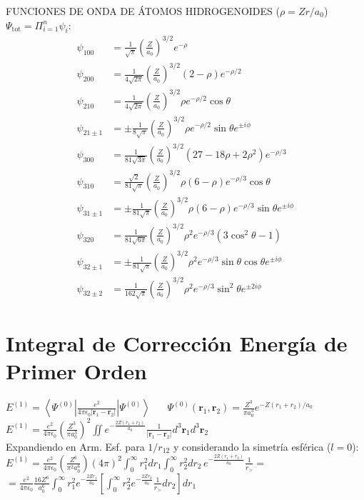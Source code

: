
FUNCIONES DE ONDA DE ÁTOMOS HIDROGENOIDES ($\rho = Zr/a_0$) $\Psi_{\text{tot}}= \Pi_{i=1}^n \psi_i$:
\begin{align*}
\psi_{100} &= \frac{1}{\sqrt{\pi}} \left(\frac{Z}{a_0}\right)^{3/2} e^{-\rho} \\
\psi_{200} &= \frac{1}{4\sqrt{2\pi}} \left(\frac{Z}{a_0}\right)^{3/2} (2-\rho)e^{-\rho/2} \\
\psi_{210} &= \frac{1}{4\sqrt{2\pi}} \left(\frac{Z}{a_0}\right)^{3/2} \rho e^{-\rho/2} \cos\theta \\
\psi_{21\pm1} &= \pm \frac{1}{8\sqrt{\pi}} \left(\frac{Z}{a_0}\right)^{3/2} \rho e^{-\rho/2} \sin\theta e^{\pm i\phi} \\
\psi_{300} &= \frac{1}{81\sqrt{3\pi}} \left(\frac{Z}{a_0}\right)^{3/2} (27 - 18\rho + 2\rho^2)e^{-\rho/3} \\
\psi_{310} &= \frac{\sqrt{2}}{81\sqrt{\pi}} \left(\frac{Z}{a_0}\right)^{3/2} \rho(6 - \rho)e^{-\rho/3} \cos\theta \\
\psi_{31\pm1} &= \pm \frac{1}{81\sqrt{\pi}} \left(\frac{Z}{a_0}\right)^{3/2} \rho(6 - \rho)e^{-\rho/3} \sin\theta e^{\pm i\phi} \\
\psi_{320} &= \frac{1}{81\sqrt{6\pi}} \left(\frac{Z}{a_0}\right)^{3/2} \rho^2 e^{-\rho/3} (3\cos^2\theta - 1) \\
\psi_{32\pm1} &= \pm \frac{1}{81\sqrt{\pi}} \left(\frac{Z}{a_0}\right)^{3/2} \rho^2 e^{-\rho/3} \sin\theta \cos\theta e^{\pm i\phi} \\
\psi_{32\pm2} &= \frac{1}{162\sqrt{\pi}} \left(\frac{Z}{a_0}\right)^{3/2} \rho^2 e^{-\rho/3} \sin^2\theta e^{\pm 2i\phi}
\end{align*}



\section*{Integral de Corrección Energía de Primer Orden }
$ E^{(1)} = \left\langle \Psi^{(0)} \left| \frac{e^2}{4\pi\epsilon_0 |\mathbf{r}_1 - \mathbf{r}_2|} \right| \Psi^{(0)} \right\rangle
\;\;\;\;\;\; \Psi^{(0)}(\mathbf{r}_1, \mathbf{r}_2) = \frac{Z^3}{\pi a_0^3} e^{-Z(r_1+r_2)/a_0}$
$
E^{(1)} = \frac{e^2}{4\pi\epsilon_0} \left( \frac{Z^3}{\pi a_0^3} \right)^2 \iint e^{-\frac{2Z(r_1+r_2)}{a_0}} \frac{1}{|\mathbf{r}_1 - \mathbf{r}_2|} d^3\mathbf{r}_1 d^3\mathbf{r}_2$\\
Expandiendo en Arm. Esf. para $1/r_{12}$ y considerando la simetría esférica ($l=0$):
$E^{(1)} = \frac{e^2}{4\pi\epsilon_0} \left( \frac{Z^6}{\pi^2 a_0^6} \right) (4\pi)^2 \int_0^\infty r_1^2 dr_1 \int_0^\infty r_2^2 dr_2 \, e^{-\frac{2Z(r_1+r_2)}{a_0}} \frac{1}{r_>} =$ \\
$= \frac{e^2}{4\pi\epsilon_0} \frac{16Z^6}{a_0^6} \int_0^\infty r_1^2 e^{-\frac{2Zr_1}{a_0}} \left[ \int_0^\infty r_2^2 e^{-\frac{2Zr_2}{a_0}} \frac{1}{r_>} dr_2 \right] dr_1$

